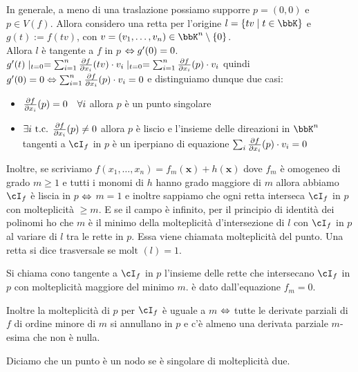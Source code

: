 \documentclass[a4paper,NoNotes,GeneralMath]{stdmdoc}
\newcommand{\Molt}{\text{molt }}
\begin{document}
	\vskip 0.8cm
	
	In generale, a meno di una traslazione possiamo supporre $p = (0,0)$ e $p \in V(f)$. Allora considero una retta per l'origine $l= \{ tv \mid t \in \bbK \}$ e $g(t) := f(tv)$, con $v = (v_1, \ldots, v_n) \in \bbK^n \setminus \{0\}$. \\
	Allora $l$ è tangente a $f$ in $p$ $\Leftrightarrow g'(0) = 0$. $g'(t)\mid_{t=0} = \sum_{i=1}^n \dpar{f}{x_i} (tv) \cdot v_i \mid_{t=0} = \sum_{i=1}^{n} \dpar{f}{x_i} (p) \cdot v_i$ quindi $g'(0) = 0 \sse \sum_{i=1}^{n} \dpar{f}{x_i} (p) \cdot v_i = 0$ e distinguiamo dunque due casi:
	\begin{itemize}
		\item $\dpar{f}{x_i} (p) = 0 \quad \forall i$ allora $p$ è un punto singolare
		\item $\exists i \tc \dpar{f}{x_i} (p) \neq 0$ allora $p$ è liscio e l'insieme delle direazioni in $\bbK^n$ tangenti a $\cI_f$ in $p$ è un iperpiano di equazione $\sum_i \dpar{f}{x_i} (p) \cdot v_i = 0$
	\end{itemize}

	\vskip 0.8cm

	Inoltre, se scriviamo $f(x_1, \ldots, x_n) = f_m(\bm x) + h(\bm x)$ dove $f_m$ è omogeneo di grado $m \ge 1$ e tutti i monomi di $h$ hanno grado maggiore di $m$ allora abbiamo $\cI_f$ è liscia in $p$ $\Leftrightarrow$ $m = 1$ e inoltre sappiamo che ogni retta interseca $\cI_f$ in $p$ con molteplicità $\ge m$. E se il campo è infinito, per il principio di identità dei polinomi ho che $m$ è il minimo della molteplicità d'intersezione di $l$ con $\cI_f$ in $p$ al variare di $l$ tra le rette in $p$. Essa viene chiamata molteplicità del punto.
	Una retta si dice trasversale se $\Molt (l) = 1$.

	Si chiama cono tangente a $\cI_f$ in $p$ l'insieme delle rette che intersecano $\cI_f$ in $p$ con molteplicità maggiore del minimo $m$. è dato dall'equazione $f_m = 0$.

	Inoltre la molteplicità di $p$ per $\cI_f$ è uguale a $m$ $\Leftrightarrow$ tutte le derivate parziali di $f$ di ordine minore di $m$ si annullano in $p$ e c'è almeno una derivata parziale $m$-esima che non è nulla.

	Diciamo che un punto è un nodo se è singolare di molteplicità due.
\end{document}
